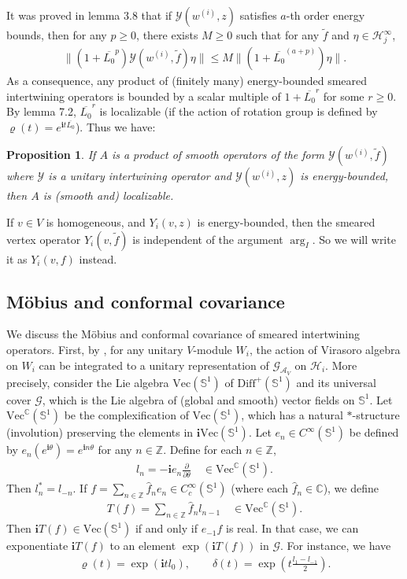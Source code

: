 \documentclass[12pt,a4paper]{article}
\theoremstyle{definition}
\theoremstyle{plain}
\newtheorem{pp}[df]{Proposition}
\newcommand{\mc}{\mathcal}
\newcommand{\wtd}{\widetilde}
\newcommand{\wht}{\widehat}
\newcommand{\ovl}{\overline}
\newcommand{\Diffp}{\mathrm{Diff}^+}
\newcommand{\GAV}{\mathscr G_{\mathcal A_V}}
\newcommand{\Vect}{\mathrm{Vec}}
\newcommand{\Vectc}{\mathrm{Vec}^{\mathbb C}}
\newcommand{\scr}{\mathscr}
\newcommand{\im}{\mathbf{i}}
\newcommand{\mbb}{\mathbb}
\numberwithin{equation}{subsection}
\begin{document}
It was proved in \cite{Gui19a} lemma 3.8 that if $\mc Y(w^{(i)},z)$ satisfies $a$-th order energy bounds, then for any $p\geq0$, there exists $M\geq0$ such that for any $\wtd f$ and $\eta\in\mc H_j^\infty$,
\begin{align*}
\big\lVert (1+\ovl{L_0}^p) \mc Y(w^{(i)},\wtd f)\eta\big\lVert \leq M \big\lVert  (1+\ovl{L_0}^{(a+p)}) \eta\big\lVert.
\end{align*}
As a consequence, any product of (finitely many) energy-bounded smeared intertwining operators is bounded by a scalar multiple of $1+\ovl{L_0}^r$ for some $r\geq0$. By \cite{CKLW18} lemma 7.2, $\ovl{L_0}^r$ is localizable (if the action of rotation group is defined by $\varrho(t)=e^{\im t\ovl{L_0}}$). Thus we have:

\begin{pp}\label{lb45}
If $A$ is a product of smooth operators of the form $\mc Y(w^{(i)},\wtd f)$ where $\mc Y$ is a unitary intertwining operator and $\mc Y(w^{(i)},z)$ is energy-bounded, then $A$ is (smooth and) localizable.
\end{pp}

If $v\in V$ is homogeneous,  and $Y_i(v,z)$ is energy-bounded, then the smeared vertex operator $Y_i(v,\wtd f)$ is independent of the argument $\arg_I$. So we will write it as $Y_i(v,f)$ instead.

\subsection{M\"obius and conformal covariance}

We discuss the M\"obius and conformal covariance of smeared intertwining operators. First, by \cite{TL99}, for any unitary $V$-module $W_i$, the action of Virasoro algebra on $W_i$ can be integrated to a unitary representation of $\GAV$ on $\mc H_i$. More precisely, consider the Lie algebra $\Vect(\mbb S^1)$ of $\Diffp(\mbb S^1)$ and its universal cover $\scr G$, which is the Lie algebra of (global and smooth) vector fields on $\mbb S^1$. Let $\Vectc(\mbb S^1)$ be the complexification of $\Vect(\mbb S^1)$, which has a natural $*$-structure (involution) preserving the elements in $\im\Vect(\mbb S^1)$.  Let $e_n\in C^\infty(\mbb S^1)$ be  defined by $e_n(e^{\im\theta})=e^{\im n\theta}$ for any $n\in\mbb Z$. Define for each $n\in\mbb Z$,
\begin{align*}
l_n=-\im e_n\frac{\partial}{\partial\theta}\quad \in\Vectc(\mbb S^1).
\end{align*}
Then $l_n^*=l_{-n}$. If $f=\sum_{n\in\mbb Z}\wht f_ne_n\in C_c^\infty(\mbb S^1)$ (where each $\wht f_n\in\mbb C$), we define
\begin{align*}
T(f)=\sum_{n\in\mbb Z}\wht f_nl_{n-1}\quad\in\Vectc(\mbb S^1).
\end{align*}
Then $\im T(f)\in\Vect(\mbb S^1)$ if and only if $e_{-1}f$ is real. In that case, we can exponentiate $\im T(f)$ to an element $\exp(\im T(f))$ in $\scr G$. For instance, we have
\begin{gather*}
\varrho(t)=\exp(\im tl_0),\qquad \delta(t)=\exp(t\frac{l_1-l_{-1}}2).
\end{gather*}
\end{document}
